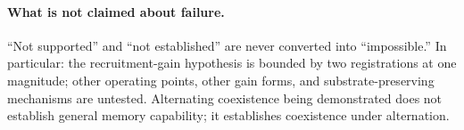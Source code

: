 \paragraph{What is not claimed about failure.}
``Not supported'' and ``not established'' are never converted into
``impossible.'' In particular: the recruitment-gain hypothesis is
bounded by two registrations at one magnitude; other operating points,
other gain forms, and substrate-preserving mechanisms are untested.
Alternating coexistence being demonstrated does not establish general
memory capability; it establishes coexistence under alternation.